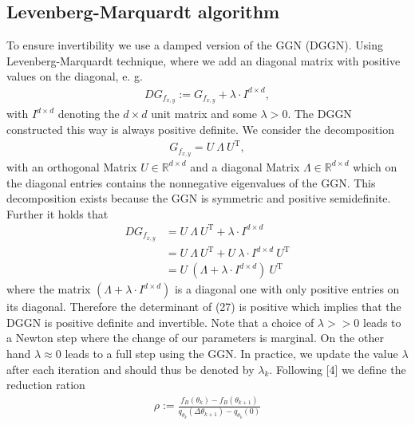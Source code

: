 \documentclass[conference]{IEEEtran}
\begin{document}
	\subsection{Levenberg-Marquardt algorithm }
	To ensure invertibility %
	we use a damped version of the GGN (DGGN). Using Levenberg-Marquardt technique, where we add an diagonal matrix with positive values on the diagonal, e. g.
	\begin{align}
	DG_{f_{x, y}} := G_{f_{x, y}} + \lambda\cdot I^{d\times d},
	\end{align}
	with $I^{d\times d}$ denoting the $d\times d$ unit matrix and some $\lambda>0$.
	The DGGN constructed this way is always positive definite. 
	We consider the decomposition
	\begin{align}
	G_{f_{x, y}} = U\:\Lambda\:U^{\mathrm{T}},
	\end{align}
	with an orthogonal Matrix $U\in\mathbb{R}^{d\times d}$ and a diagonal Matrix $\Lambda\in\mathbb{R}^{d\times d}$ which on the diagonal entries contains the nonnegative eigenvalues of the GGN. This decomposition exists because the GGN is symmetric and positive semidefinite. Further it holds that
	\begin{align}
	DG_{f_{x, y}} &= U\:\Lambda\:U^{\mathrm{T}} + \lambda\cdot I^{d\times d}\\
	&= U\:\Lambda\:U^{\mathrm{T}} + U\:\lambda\cdot I^{d\times d}\:U^{\mathrm{T}}\\
	&= U\:\left(\Lambda + \lambda\cdot I^{d\times d}\right)\:U^{\mathrm{T}}
	\end{align}
	where the matrix $\left(\Lambda + \lambda\cdot I^{d\times d}\right)$ is a diagonal one with only positive entries on its diagonal. Therefore the determinant of (27) is positive which implies that the DGGN is positive definite and invertible.
	Note that a choice of $\lambda>>0$ leads to a Newton step where the change of our parameters is marginal. On the other hand $\lambda\approx 0$ leads to a full step using the GGN. In practice, we update the value $\lambda$ after each iteration and should thus be denoted by $\lambda_{k}$. Following [4] we define the reduction ration
	\begin{align}
	\rho := \frac{f_{B}(\theta_{k}) - f_{B}(\theta_{k+1})}{q_{\theta_{k}}(\Delta\theta_{k + 1}) - q_{\theta_{k}}(0)}
	\end{align}
\end{document}

